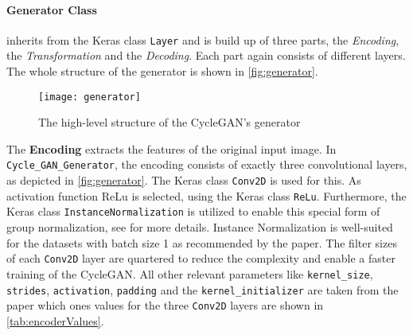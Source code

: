 \documentclass[fleqn,10pt]{SelfArx} %
\begin{document}
\paragraph{Generator Class} inherits from the Keras class \texttt{Layer} and is build up of three parts, the \textit{Encoding}, the \textit{Transformation} and the \textit{Decoding}. Each part again consists of different layers. The whole structure of the generator is shown in \autoref{fig:generator}.~\cite{Introduction-to-Cycle-GANs}

\begin{figure*}[htb] 
	\centering 
	\texttt{[image: generator]}
	\caption{The high-level structure of the Cycle\ac{GAN}'s generator \cite{Introduction-to-Cycle-GANs}}
	\label{fig:generator}
\end{figure*}

The \textbf{Encoding} extracts the features of the original input image. In \texttt{Cycle\_GAN\_Generator}, the encoding consists of exactly three convolutional layers, as depicted in \autoref{fig:generator}. The Keras class \texttt{Conv2D} is used for this. As activation function \ac{ReLu} is selected, using the Keras class \texttt{ReLu}. Furthermore, the Keras class \texttt{InstanceNormalization} is utilized to enable this special form of group normalization, see \cite{google-tf-InstanceNormalization} for more details. Instance Normalization is well-suited for the datasets with batch size 1 as recommended by the paper. The filter sizes of each \texttt{Conv2D} layer are quartered to reduce the complexity and enable a faster training of the Cycle\ac{GAN}. All other relevant parameters like \texttt{kernel\_size}, \texttt{strides}, \texttt{activation}, \texttt{padding} and the \texttt{kernel\-\_initializer} are taken from the paper which ones values for the three \texttt{Conv2D} layers are shown in \autoref{tab:encoderValues}.~\cite{image-to-image-ccan}
\end{document}
